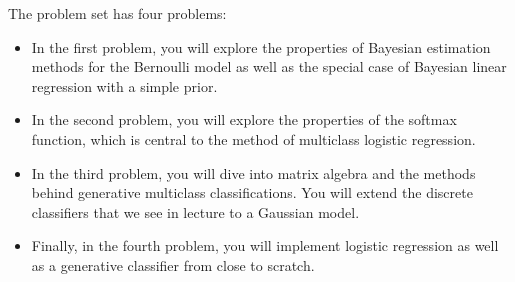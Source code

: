 \documentclass[submit]{harvardml}
\begin{document}
The problem set has four problems:
\begin{itemize}
\item In the first problem, you will explore the properties of Bayesian
estimation methods for the Bernoulli model as well as the special
case of Bayesian linear regression with a simple prior.
%
\item In the second problem, you will explore the properties of the softmax
function, which is central to
the method of
multiclass logistic regression.
%
\item  In the third
problem, you will dive into  matrix algebra and the methods behind
generative multiclass classifications. You will extend the discrete classifiers
that we see in  lecture to a Gaussian model.
%
\item Finally, in the fourth problem, you will implement
 logistic regression as well as a generative classifier
from close to scratch.
%
\end{itemize}
\end{document}
